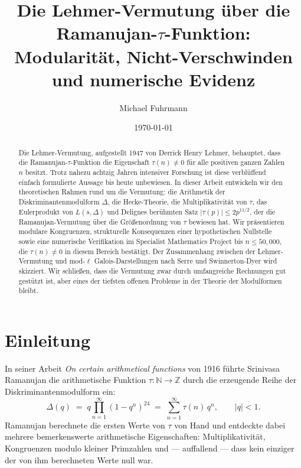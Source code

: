 \documentclass[12pt,a4paper]{amsart}
\author{Michael Fuhrmann}
\date{\today}
\title{Die Lehmer-Vermutung über die Ramanujan-$\tau$-Funktion:\\
Modularität, Nicht-Verschwinden und numerische Evidenz}
\theoremstyle{definition}
\begin{document}
\begin{abstract}
Die Lehmer-Vermutung, aufgestellt 1947 von Derrick Henry Lehmer, behauptet, dass
die Ramanujan-$\tau$-Funktion die Eigenschaft $\tau(n) \neq 0$ für alle positiven
ganzen Zahlen $n$ besitzt. Trotz nahezu achtzig Jahren intensiver Forschung ist
diese verblüffend einfach formulierte Aussage bis heute unbewiesen. In dieser Arbeit
entwickeln wir den theoretischen Rahmen rund um die Vermutung: die Arithmetik der
Diskriminantenmodulform $\Delta$, die Hecke-Theorie, die Multiplikativität von
$\tau$, das Eulerprodukt von $L(s, \Delta)$ und Delignes berühmten Satz
$|\tau(p)| \leq 2p^{11/2}$, der die Ramanujan-Vermutung über die Größenordnung von
$\tau$ bewiesen hat. Wir präsentieren modulare Kongruenzen, strukturelle Konsequenzen
einer hypothetischen Nullstelle sowie eine numerische Verifikation im Specialist
Mathematics Project bis $n \leq 50{,}000$, die $\tau(n) \neq 0$ in diesem Bereich
bestätigt. Der Zusammenhang zwischen der Lehmer-Vermutung und mod-$\ell$
Galois-Darstellungen nach Serre und Swinnerton-Dyer wird skizziert. Wir schließen,
dass die Vermutung zwar durch umfangreiche Rechnungen gut gestützt ist, aber eines
der tiefsten offenen Probleme in der Theorie der Modulformen bleibt.
\end{abstract}

\maketitle

\tableofcontents

\section{Einleitung}

In seiner Arbeit \emph{On certain arithmetical functions} von 1916 führte Srinivasa
Ramanujan die arithmetische Funktion $\tau : \mathbb{N} \to \mathbb{Z}$ durch die
erzeugende Reihe der Diskriminantenmodulform ein:
\begin{equation}\label{eq:delta-def}
  \Delta(q) \;=\; q \prod_{n=1}^{\infty}(1-q^n)^{24}
  \;=\; \sum_{n=1}^{\infty} \tau(n)\, q^n,
  \qquad |q| < 1.
\end{equation}
Ramanujan berechnete die ersten Werte von $\tau$ von Hand und entdeckte dabei
mehrere bemerkenswerte arithmetische Eigenschaften: Multiplikativität, Kongruenzen
modulo kleiner Primzahlen und --- auffallend --- dass kein einziger der von ihm
berechneten Werte null war.
\end{document}
